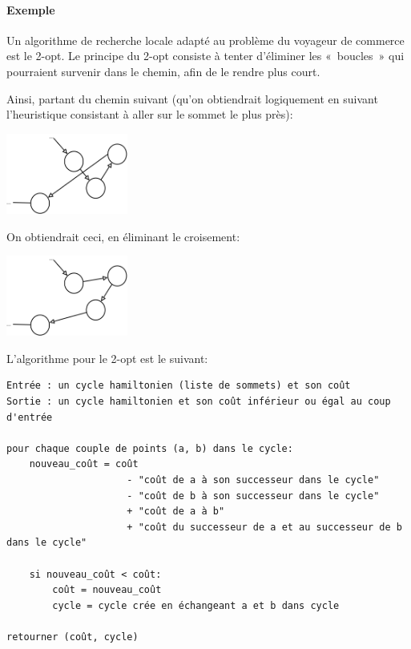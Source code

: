     \paragraph{Exemple} Un algorithme de recherche locale adapté au problème
    du voyageur de commerce est le 2-opt.
    Le principe du 2-opt consiste à tenter d'éliminer les «~boucles~» qui
    pourraient survenir dans le chemin, afin de le rendre plus court.

    Ainsi, partant du chemin suivant (qu'on obtiendrait logiquement en suivant
    l'heuristique consistant à aller sur le sommet le plus près):

    \begin{center}
    \includegraphics[width=0.3\textwidth]{graphes/2opt1.png}
    \end{center}

    On obtiendrait ceci, en éliminant le croisement:

    \begin{center}
    \includegraphics[width=0.3\textwidth]{graphes/2opt2.png}
    \end{center}

    L'algorithme pour le 2-opt est le suivant:
      \begin{lstlisting}
Entrée : un cycle hamiltonien (liste de sommets) et son coût
Sortie : un cycle hamiltonien et son coût inférieur ou égal au coup d'entrée

pour chaque couple de points (a, b) dans le cycle:
    nouveau_coût = coût
                     - "coût de a à son successeur dans le cycle"
                     - "coût de b à son successeur dans le cycle"
                     + "coût de a à b"
                     + "coût du successeur de a et au successeur de b dans le cycle"

    si nouveau_coût < coût:
        coût = nouveau_coût
        cycle = cycle crée en échangeant a et b dans cycle

retourner (coût, cycle)
      \end{lstlisting}

